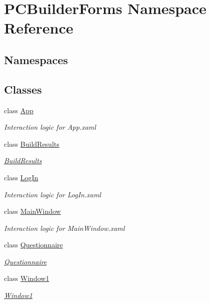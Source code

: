 \hypertarget{namespace_p_c_builder_forms}{}\section{P\+C\+Builder\+Forms Namespace Reference}
\label{namespace_p_c_builder_forms}
\subsection*{Namespaces}
\begin{DoxyCompactItemize}
\end{DoxyCompactItemize}
\subsection*{Classes}
\begin{DoxyCompactItemize}
\item 
class \hyperlink{class_p_c_builder_forms_1_1_app}{App}
\begin{DoxyCompactList}\small\item\em Interaction logic for App.\+xaml \end{DoxyCompactList}\item 
class \hyperlink{class_p_c_builder_forms_1_1_build_results}{Build\+Results}
\begin{DoxyCompactList}\small\item\em \hyperlink{class_p_c_builder_forms_1_1_build_results}{Build\+Results} \end{DoxyCompactList}\item 
class \hyperlink{class_p_c_builder_forms_1_1_log_in}{Log\+In}
\begin{DoxyCompactList}\small\item\em Interaction logic for Log\+In.\+xaml \end{DoxyCompactList}\item 
class \hyperlink{class_p_c_builder_forms_1_1_main_window}{Main\+Window}
\begin{DoxyCompactList}\small\item\em Interaction logic for Main\+Window.\+xaml \end{DoxyCompactList}\item 
class \hyperlink{class_p_c_builder_forms_1_1_questionnaire}{Questionnaire}
\begin{DoxyCompactList}\small\item\em \hyperlink{class_p_c_builder_forms_1_1_questionnaire}{Questionnaire} \end{DoxyCompactList}\item 
class \hyperlink{class_p_c_builder_forms_1_1_window1}{Window1}
\begin{DoxyCompactList}\small\item\em \hyperlink{class_p_c_builder_forms_1_1_window1}{Window1} \end{DoxyCompactList}\end{DoxyCompactItemize}
